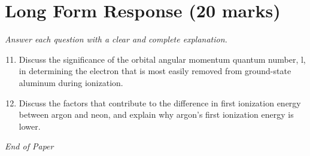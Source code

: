 \documentclass[12pt]{article}
\begin{document}
\section*{Long Form Response (20 marks)}
\textit{Answer each question with a clear and complete explanation.}
\begin{enumerate}[label=\arabic*.]
\setcounter{enumi}{10}
\item Discuss the significance of the orbital angular momentum quantum number, l, in determining the electron that is most easily removed from ground-state aluminum during ionization.
\item Discuss the factors that contribute to the difference in first ionization energy between argon and neon, and explain why argon's first ionization energy is lower.
\end{enumerate}

\vfill
\noindent\textit{End of Paper}
\end{document}
